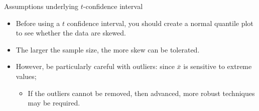 \documentclass[
  ignorenonframetext,
]{beamer}
\providecommand{\tightlist}{%
  \setlength{\itemsep}{0pt}\setlength{\parskip}{0pt}}
\begin{document}
\begin{frame}{Assumptions underlying \(t\)-confidence interval}
\label{assumptions-underlying-t-confidence-interval-9}
\begin{itemize}
\item
  Before using a \(t\) confidence interval, you should create a normal
  quantile plot to see whether the data are skewed.
\item
  The larger the sample size, the more skew can be tolerated.
\item
  However, be particularly careful with outliers: since \(\bar{x}\) is
  sensitive to extreme values;

  \begin{itemize}
  \tightlist
  \item
    If the outliers cannot be removed, then advanced, more robust
    techniques may be required.
  \end{itemize}
\end{itemize}
\end{frame}
\end{document}

